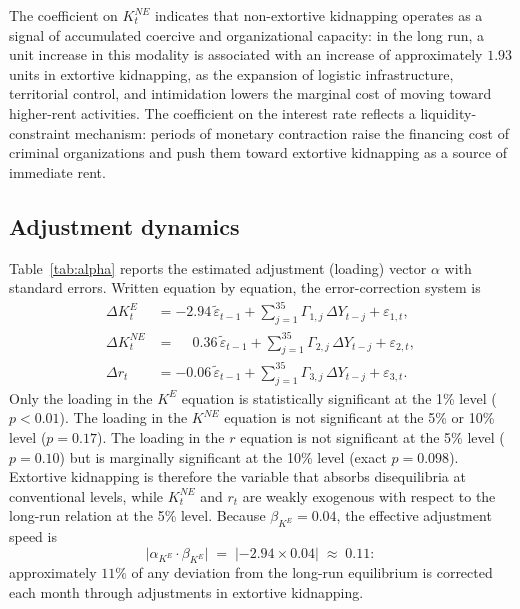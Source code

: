 \documentclass[12pt]{article}
\numberwithin{equation}{section}
\numberwithin{table}{section}
\theoremstyle{definition}
\newcommand{\KE}{K^{E}}
\newcommand{\KNE}{K^{NE}}
\begin{document}
The coefficient on $\KNE_t$ indicates that non-extortive kidnapping operates
as a signal of accumulated coercive and organizational capacity: in the long
run, a unit increase in this modality is associated with an increase of
approximately $1.93$ units in extortive kidnapping, as the expansion of
logistic infrastructure, territorial control, and intimidation lowers the
marginal cost of moving toward higher-rent activities. The coefficient on
the interest rate reflects a liquidity-constraint mechanism: periods of
monetary contraction raise the financing cost of criminal organizations and
push them toward extortive kidnapping as a source of immediate rent.

\subsection{Adjustment dynamics}

Table~\ref{tab:alpha} reports the estimated adjustment (loading) vector
$\alpha$ with standard errors. Written equation by equation, the
error-correction system is
\begin{align}
\Delta \KE_t  &= -2.94\,\tilde\varepsilon_{t-1}
 + \textstyle\sum_{j=1}^{35}\Gamma_{1,j}\,\Delta Y_{t-j} + \varepsilon_{1,t},
\label{eq:vec1}\\
\Delta \KNE_t &= \phantom{-}0.36\,\tilde\varepsilon_{t-1}
 + \textstyle\sum_{j=1}^{35}\Gamma_{2,j}\,\Delta Y_{t-j} + \varepsilon_{2,t},
\label{eq:vec2}\\
\Delta r_t    &= -0.06\,\tilde\varepsilon_{t-1}
 + \textstyle\sum_{j=1}^{35}\Gamma_{3,j}\,\Delta Y_{t-j} + \varepsilon_{3,t}.
\label{eq:vec3}
\end{align}
Only the loading in the $\KE$ equation is statistically significant at the
1\% level ($p<0.01$). The loading in the $\KNE$ equation is not significant
at the 5\% or 10\% level ($p=0.17$). The loading in the $r$ equation is not
significant at the 5\% level ($p=0.10$) but is marginally significant at the
10\% level (exact $p=0.098$). Extortive kidnapping is therefore the variable
that absorbs disequilibria at conventional levels, while $\KNE_t$ and $r_t$
are weakly exogenous with respect to the long-run relation at the 5\% level.
Because $\beta_{\KE} = 0.04$, the effective
adjustment speed is
\begin{equation}
\bigl|\alpha_{\KE}\cdot\beta_{\KE}\bigr| \;=\;
\lvert -2.94 \times 0.04\rvert \;\approx\; 0.11 :
\label{eq:speed}
\end{equation}
approximately $11\%$ of any deviation from the long-run equilibrium is
corrected each month through adjustments in extortive kidnapping.
\end{document}
